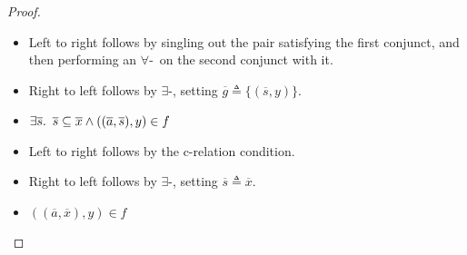 \begin{prop}
\begin{proof}
\begin{itemize}
      \addtolength{\itemsep}{.3\baselineskip}

      \item[\phantom{\imps}]
        Left to right follows by singling out the pair satisfying the first conjunct, and then performing an $\forall$-\Elim~on the second conjunct with it.

      \item[\phantom{\imps}]
        Right to left follows by $\exists$-\Intro, setting $\overline{g}\triangleq\{(\overline{s},y)\}$.

      \item[\iffs]
        $\exists\overline{s}\ldotp~\overline{s}\subseteq\overline{x}\land((\overline{a},\overline{s}),y)\in f$

      \item[\phantom{\imps}]
        Left to right follows by the c-relation condition.

      \item[\phantom{\imps}]
        Right to left follows by $\exists$-\Intro, setting $\overline{s}\triangleq\overline{x}$.

      \item[\iffs]
        $((\overline{a},\overline{x}),y)\in f$
        \qedhere
    \end{itemize}
  \end{proof}
\end{prop}

